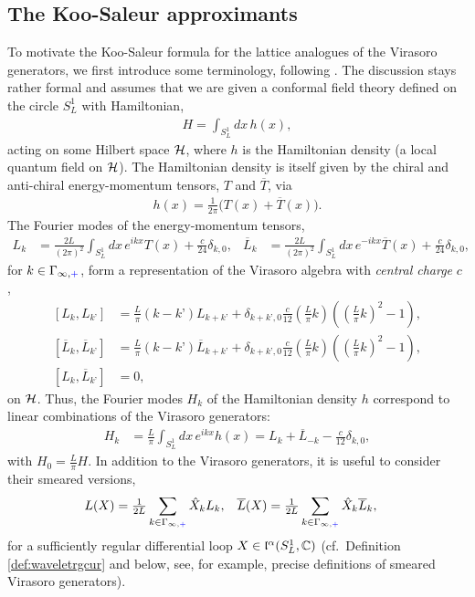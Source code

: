 \documentclass[a4paper, 11pt]{article}
\newcommand{\fl}{\mathfrak{l}}\newcommand{\cl}{\mathcal{l}}
\DeclareMathOperator{\1}{\mathds{1}}
\begin{document}
\subsection{The Koo-Saleur approximants}
\label{sec:KSapprox}
To motivate the Koo-Saleur formula for the lattice analogues of the Virasoro generators, we first introduce some terminology, following \cite{MilstedExtractionOfConformal}. The discussion stays rather formal and assumes that we are given a conformal field theory defined on the circle $S^{1}_{L}$ with Hamiltonian,
\begin{align}
\label{eq:cftH}
H = \int_{S^{1}_{L}} dx\, h(x),
\end{align}
acting on some Hilbert space $\mathcal{H}$, where $h$ is the Hamiltonian density (a local quantum field on $\mathcal{H}$). The Hamiltonian density is itself given by the chiral and anti-chiral energy-momentum tensors, $T$ and $\overline{T}$, via
\begin{align}
\label{eq:cftHd}
h(x) = \tfrac{1}{2\pi}\big(T(x)+\overline{T}(x)\big).
\end{align}
The Fourier modes of the energy-momentum tensors,
\begin{align}
\label{eq:vira}
L_k &\!=\!\tfrac{2L}{(2\pi)^2}\int_{S^{1}_{L}}\!dx\, e^{ikx} T(x)\!+\!\tfrac{c}{24}\delta_{k,0}, & \overline{L}_k &\!=\!\tfrac{2L}{(2\pi)^2}\int_{S^{1}_{L}}\!dx\, e^{-ikx} \overline{T}(x)\!+\!\tfrac{c}{24}\delta_{k,0},
\end{align}
for $k\in\Gamma_{\infty,{\color{blue}+}}$, form a representation of the Virasoro algebra with \emph{central charge} $c$ \cite{DiFrancescoCFTBook},
\begin{align}
\label{eq:viralg}
[L_{k}, L_{k’}] & = \tfrac{L}{\pi}(k-k’)L_{k+k’} + \delta_{k+k’,0}\tfrac{c}{12}(\tfrac{L}{\pi}k)((\tfrac{L}{\pi}k)^2-1), \\ \nonumber 
[\overline{L}_{k}, \overline{L}_{k’}] & = \tfrac{L}{\pi}(k-k’)\overline{L}_{k+k’} + \delta_{k+k’,0}\tfrac{c}{12}(\tfrac{L}{\pi}k)((\tfrac{L}{\pi}k)^2-1), \\ \nonumber
[L_{k}, \overline{L}_{k’}] & = 0,
\end{align}
on $\mathcal{H}$. Thus, the Fourier modes $H_k$ of the Hamiltonian density $h$ correspond to linear combinations of the Virasoro generators:
\begin{align}
\label{eq:fourierH}
H_k & = \tfrac{L}{\pi}\int_{S^{1}_{L}}\!dx\, e^{ikx}h(x) = L_k + \overline{L}_{-k} - \tfrac{c}{12}\delta_{k,0},
\end{align}
with $H_0 = \frac{L}{\pi}H$. In addition to the Virasoro generators, it is useful to consider their smeared versions,
\begin{align}
\label{eq:virasmeared}
L(X) & = \tfrac{1}{2L}\sum_{k\in\Gamma_{\infty,{\color{blue}+}}}\hat{X}_{k}L_{k}, & \overline{L}(X) & = \tfrac{1}{2L}\sum_{k\in\Gamma_{\infty,{\color{blue}+}}}\hat{X}_{k}\overline{L}_{k},
\end{align}
for a sufficiently regular differential loop $X\in\fl^{\alpha}(S^{1}_{L},\C)$ (cf.~Definition \ref{def:waveletrgcur} and below, see, for example, \cite{GoodmanProjectiveUnitaryPositive, CarpiOnTheUniqueness} precise definitions of smeared Virasoro generators).
\end{document}
